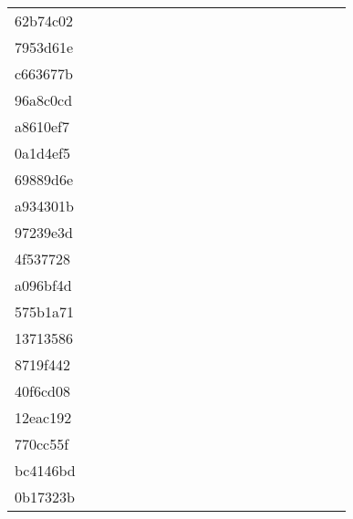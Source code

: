 \begin{table*}[htb]
\begin{tabular}{l|cccccccccccccccccc}
62b74c02  & \C & \X & \C & \X & \C & \C & \C & \C & \X & \C & \C & \C & \C & \C & \C & \C & \C \\
7953d61e  & \C & \X & \C & \X & \X & \X & \X & \C & \C & \C & \C & \C & \C & \C & \C & \C & \C \\
c663677b  & \C & \X & \X & \X & \X & \C & \C & \C & \C & \X & \X & \C & \X & \C & \C & \C & \C \\
96a8c0cd  & \C & \X & \X & \X & \X & \X & \X & \X & \X & \X & \X & \X & \X & \C & \C & \X & \X \\
a8610ef7  & \C & \X & \X & \X & \X & \X & \X & \X & \X & \X & \X & \X & \X & \X & \C & \C & \X \\
0a1d4ef5  & \C & \X & \X & \X & \X & \X & \X & \X & \X & \X & \X & \X & \X & \C & \C & \C & \C \\
69889d6e  & \C & \X & \X & \X & \X & \X & \X & \X & \X & \X & \X & \X & \X & \C & \C & \C & \C \\
a934301b  & \C & \X & \C & \X & \C & \C & \C & \C & \C & \C & \C & \C & \X & \C & \C & \C & \X \\
97239e3d  & \C & \X & \X & \X & \X & \X & \X & \X & \X & \X & \X & \X & \C & \X & \C & \X & \X \\
4f537728  & \C & \X & \X & \C & \X & \C & \C & \C & \C & \X & \C & \C & \C & \C & \C & \C & \C \\
a096bf4d  & \C & \X & \X & \X & \X & \X & \X & \X & \X & \X & \X & \X & \X & \X & \C & \X & \X \\
575b1a71  & \C & \X & \X & \X & \X & \X & \X & \X & \X & \X & \X & \X & \X & \C & \C & \C & \C \\
13713586  & \C & \X & \X & \X & \X & \X & \X & \X & \X & \X & \X & \X & \X & \C & \C & \C & \C \\
8719f442  & \C & \X & \X & \X & \X & \X & \X & \X & \X & \X & \X & \X & \X & \C & \C & \X & \X \\
40f6cd08  & \X & \X & \X & \X & \X & \X & \X & \X & \X & \X & \X & \X & \X & \X & \X & \X & \X \\
12eac192  & \C & \X & \X & \X & \X & \X & \X & \X & \X & \X & \X & \X & \C & \C & \C & \C & \X \\
770cc55f  & \C & \X & \C & \X & \X & \X & \X & \X & \X & \X & \C & \C & \C & \C & \C & \C & \C \\
bc4146bd  & \C & \X & \C & \X & \X & \C & \C & \C & \C & \X & \C & \C & \C & \C & \C & \C & \C \\
0b17323b  & \C & \X & \X & \X & \X & \C & \X & \C & \X & \C & \C & \C & \C & \C & \C & \C & \X \\

\end{tabular}
\end{table*}
